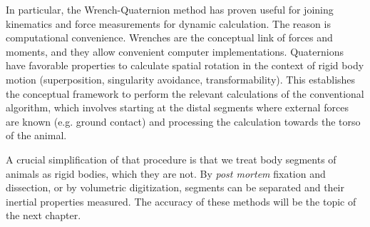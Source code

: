 In particular, the Wrench-Quaternion method \citep{Dumas2004} has proven useful for joining kinematics and force measurements for dynamic calculation.
The reason is computational convenience.
Wrenches are the conceptual link of forces and moments, and they allow convenient computer implementations.
Quaternions have favorable properties to calculate spatial rotation in the context of rigid body motion (superposition, singularity avoidance, transformability).
This establishes the conceptual framework to perform the relevant calculations of the conventional algorithm, which involves starting at the distal segments where external forces are known (e.g. ground contact) and processing the calculation towards the torso of the animal.


A crucial simplification of that procedure is that we treat body segments of animals as rigid bodies, which they are not.
By \emph{post mortem} fixation and dissection, or by volumetric digitization, segments can be separated and their inertial properties measured.
The accuracy of these methods will be the topic of the next chapter.
